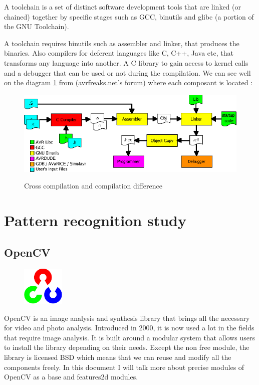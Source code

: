 	\par A toolchain is a set of distinct software development tools that are linked (or chained) together by specific stages such as GCC, binutils and glibc (a portion of the GNU Toolchain)\cite{Toolchain}.
	\par A toolchain requires binutils such as assembler and linker, that produces the binaries. Also compilers for deferent languages like C, C++, Java etc, that transforms any language into another. A C library to gain access to kernel calls and a debugger that can be used or not during the compilation. We can see well on the diagram \ref{compchain} from (avrfreaks.net's forum)  where each composant is located :
	\begin{figure}[ht]
		\begin{center}
			\includegraphics[scale=0.5]{images_not_compressed/compchain.png}
			\label{compchain}
			\caption{Cross compilation and compilation difference}
		\end{center}
	\end{figure}

		
	\section{Pattern recognition study}
	\subsection{OpenCV}
	
		\begin{figure}
	\vspace{-7mm}
	\includegraphics[width=2cm]{images_not_compressed/opencv_logo.png}
	\end{figure}
	\par OpenCV is an image analysis and synthesis library that brings all the necessary for video and photo analysis. Introduced in 2000, it is now used a lot in the fields that require image analysis.
 It is built around a modular system that allows users to install the library depending on their needs.
 Except the non free module, the library is licensed BSD which means that we can reuse and modify all the components freely.
 In this document I will talk more about precise modules of OpenCV as a base and features2d modules.
	
